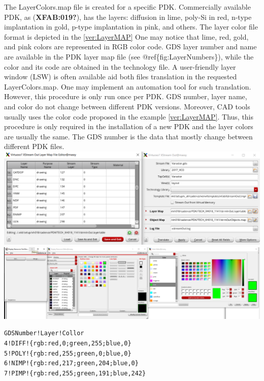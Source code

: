 \documentclass[10pt,a4paper,onecolumn]{article}
\begin{document}
The LayerColors.map file is created for a specific PDK. Commercially
available PDK, as (\textbf{XFAB:019?}), has the layers: diffusion in
lime, poly-Si in red, n-type implantation in gold, p-type implantation
in pink, and others. The layer color file format is depicted in the
\autoref{ver:LayerMAP} One may notice that lime, red, gold, and pink
colors are represented in RGB color code. GDS layer number and name are
available in the PDK layer map file (see @ref\{fig:LayerNumbers\}),
while the color and its code are obtained in the technology file. A
user-friendly layer window (LSW) is often available aid both files
translation in the requested LayerColors.map. One may implement an
automation tool for such translation. However, this procedure is only
run once per PDK. GDS number, layer name, and color do not change
between different PDK versions. Moreover, CAD tools usually uses the
color code proposed in the example \autoref{ver:LayerMAP}. Thus, this
procedure is only required in the installation of a new PDK and the
layer colors are usually the same. The GDS number is the data that
mostly change between different PDK files.
\includegraphics{img/LayerNumbers.png}%
\includegraphics{img/LayerColors.png}%

\begin{verbatim}
GDSNumber!Layer!Collor
4!DIFF!{rgb:red,0;green,255;blue,0}
5!POLY!{rgb:red,255;green,0;blue,0}
6!NIMP!{rgb:red,217;green,204;blue,0}
7!PIMP!{rgb:red,255;green,191;blue,242}
\end{verbatim}
\label{ver:LayerMAP}
\end{document}
